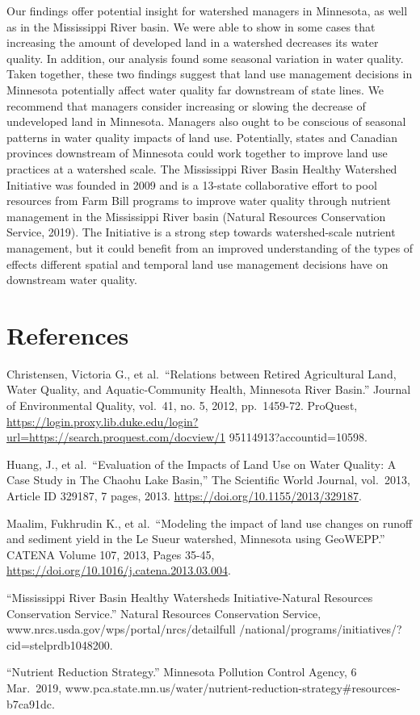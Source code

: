 \documentclass[12pt,]{article}
\begin{document}
Our findings offer potential insight for watershed managers in
Minnesota, as well as in the Mississippi River basin. We were able to
show in some cases that increasing the amount of developed land in a
watershed decreases its water quality. In addition, our analysis found
some seasonal variation in water quality. Taken together, these two
findings suggest that land use management decisions in Minnesota
potentially affect water quality far downstream of state lines. We
recommend that managers consider increasing or slowing the decrease of
undeveloped land in Minnesota. Managers also ought to be conscious of
seasonal patterns in water quality impacts of land use. Potentially,
states and Canadian provinces downstream of Minnesota could work
together to improve land use practices at a watershed scale. The
Mississippi River Basin Healthy Watershed Initiative was founded in 2009
and is a 13-state collaborative effort to pool resources from Farm Bill
programs to improve water quality through nutrient management in the
Mississippi River basin (Natural Resources Conservation Service, 2019).
The Initiative is a strong step towards watershed-scale nutrient
management, but it could benefit from an improved understanding of the
types of effects different spatial and temporal land use management
decisions have on downstream water quality.

\newpage

\hypertarget{references}{%
\section{References}\label{references}}

Christensen, Victoria G., et al.~``Relations between Retired
Agricultural Land, Water Quality, and Aquatic-Community Health,
Minnesota River Basin.'' Journal of Environmental Quality, vol.~41, no.
5, 2012, pp.~1459-72. ProQuest,
\url{https://login.proxy.lib.duke.edu/login?url=https://search.proquest.com/docview/1}
95114913?accountid=10598.

Huang, J., et al.~``Evaluation of the Impacts of Land Use on Water
Quality: A Case Study in The Chaohu Lake Basin,'' The Scientific World
Journal, vol.~2013, Article ID 329187, 7 pages, 2013.
\url{https://doi.org/10.1155/2013/329187}.

Maalim, Fukhrudin K., et al.~``Modeling the impact of land use changes
on runoff and sediment yield in the Le Sueur watershed, Minnesota using
GeoWEPP.'' CATENA Volume 107, 2013, Pages 35-45,
\url{https://doi.org/10.1016/j.catena.2013.03.004}.

``Mississippi River Basin Healthy Watersheds Initiative-Natural
Resources Conservation Service.'' Natural Resources Conservation
Service, www.nrcs.usda.gov/wps/portal/nrcs/detailfull
/national/programs/initiatives/?cid=stelprdb1048200.

``Nutrient Reduction Strategy.'' Minnesota Pollution Control Agency, 6
Mar.~2019,
www.pca.state.mn.us/water/nutrient-reduction-strategy\#resources-b7ca91dc.
\end{document}
